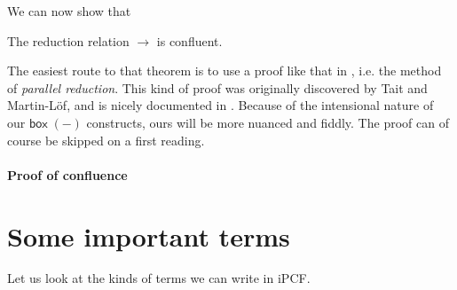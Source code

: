 \documentclass[11pt]{entcs}
\newcommand{\ibox}[1]{\mathsf{box\;}#1}
\newcommand{\red}{\mathrel{\longrightarrow}}
\begin{document}
We can now show that

\begin{thm}
  \label{thm:conf}
  The reduction relation $\red{}$ is confluent.
\end{thm}

The easiest route to that theorem is to use a proof like that in
\cite{Kavvos2017b}, i.e. the method of \emph{parallel reduction}.
This kind of proof was originally discovered by Tait and
Martin-L\"of, and is nicely documented in \cite{Takahashi1995}.
Because of the intensional nature of our $\ibox{(-)}$ constructs,
ours will be more nuanced and fiddly.  The proof can of course be
skipped on a first reading.

\paragraph{Proof of confluence}



\section{Some important terms}
  \label{sec:ipcfterms}

Let us look at the kinds of terms we can write in iPCF.
\end{document}
